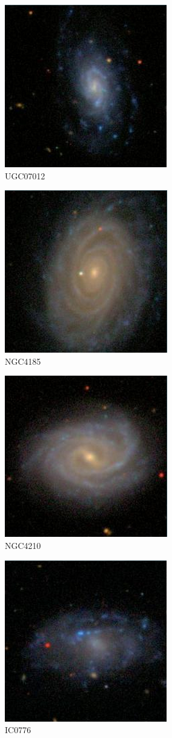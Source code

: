 \documentclass[9pt]{revtex4-1}
\begin{document}
\begin{figure}
\includegraphics[scale=0.3]{UGC07012.png}
\caption{UGC07012}
\end{figure}
\begin{figure}
\includegraphics[scale=0.3]{NGC4185.png}
\caption{NGC4185}
\end{figure}
\begin{figure}
\includegraphics[scale=0.3]{NGC4210.png}
\caption{NGC4210}
\end{figure}
\begin{figure}
\includegraphics[scale=0.3]{IC0776.png}
\caption{IC0776}
\end{figure}
\end{document}
